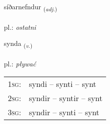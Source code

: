\documentclass[frontgrid, backgrid]{flacards}\usepackage[]{graphicx}\usepackage[]{xcolor}
\begin{document}
\renewcommand{\flhead}{\vskip5pt \fboxsep=0pt {\small\bfseries\footnotesize Lýsingarorð | przymiotnik}}
\renewcommand{\fcfoot}{\vskip5pt \fboxsep=0pt \hspace{2pt}{\small\bfseries\footnotesize 3K}}

\renewcommand{\blhead}{\vskip5pt {\small\bfseries\footnotesize Lýsingarorð | przymiotnik }}
\renewcommand{\bcfoot}{\vskip5pt \hspace{2pt}{\small\bfseries\footnotesize 3K}}


{síðarnefndur \small{\textsubscript{(\textit{adj.})}} \\[1ex] %
\textphonetic{[siːðarnɛmtʏr]} \\
pl.: \emph{ostatni} \\  [2ex]
\renewcommand*{\arraystretch}{0.8}
}

\renewcommand{\flhead}{\vskip5pt \fboxsep=0pt {\small\bfseries\footnotesize Sagnorð | czasownik}}
\renewcommand{\fcfoot}{\vskip5pt \fboxsep=0pt \hspace{2pt}{\small\bfseries\footnotesize 3K}}

\renewcommand{\blhead}{\vskip5pt {\small\bfseries\footnotesize Sagnorð | czasownik }}
\renewcommand{\bcfoot}{\vskip5pt \hspace{2pt}{\small\bfseries\footnotesize 3K}}


{synda \small{\textsubscript{(\textit{v.})}} \\[1ex] %
\textphonetic{[sɪnta]} \\
pl.: \emph{pływać} \\  [2ex]
\renewcommand*{\arraystretch}{0.8}
\begin{tabular}{p{1cm}l}
\textsc{1sg}: & syndi -- synti -- synt \\ 
\textsc{2sg}: & syndir -- syntir -- synt \\ 
\textsc{3sg}: & syndir -- synti -- synt \\ 
\end{tabular}
}
\end{document}
